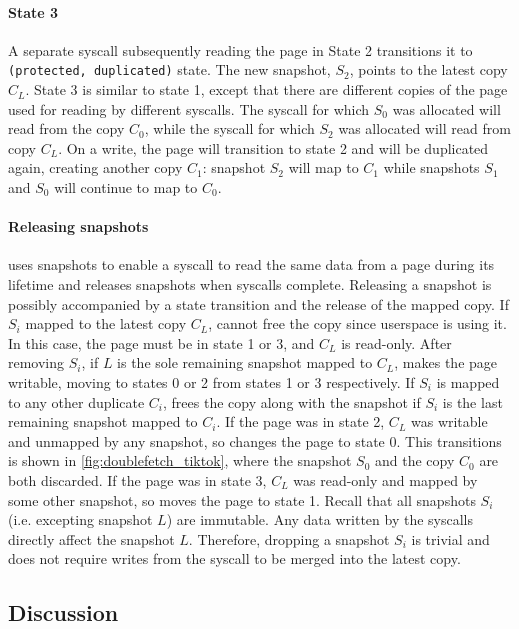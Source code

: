 \documentclass[letterpaper,twocolumn,10pt, anonymous]{article}
\begin{document}
\paragraph{State 3}
A separate syscall subsequently reading the page in State 2 transitions 
it to \texttt{(protected, duplicated)} state. 
The new snapshot, $S_2$, points to the latest copy $C_L$.
State 3 is similar to state 1, except that there are different copies of 
the page used for reading by different syscalls. 
The syscall for which $S_0$ was allocated will read from the copy $C_0$,
while the syscall for which $S_2$ was allocated will read from copy $C_L$.
On a write, the page will transition to state 2 and will be duplicated again,
creating another copy $C_1$: snapshot $S_2$ will map to $C_1$ while 
snapshots $S_1$ and $S_0$ will continue to map to $C_0$. 

\paragraph{Releasing snapshots}
\tiktok uses snapshots to enable a syscall to read the same data from a page 
during its lifetime and releases snapshots when syscalls complete. 
Releasing a snapshot is possibly accompanied by a state transition
and the release of the mapped copy.
If $S_i$ mapped to the latest copy $C_L$, \tiktok cannot free the copy
since userspace is using it.
In this case, the page must be in state 1 or 3, and $C_L$ is read-only.
After removing $S_i$, if $L$ is the sole remaining snapshot mapped to $C_L$, 
\tiktok makes the page writable, moving to states 0 or 2 from states 
1 or 3 respectively. 
If $S_i$ is mapped to any other duplicate $C_i$, \tiktok frees the copy along
with the snapshot if $S_i$ is the last remaining snapshot mapped to $C_i$.
If the page was in state 2, $C_L$ was writable and unmapped by any snapshot,
so \tiktok changes the page to state 0.
This transitions is shown in \autoref{fig:doublefetch_tiktok}, where the 
snapshot $S_0$ and the copy $C_0$ are both discarded.
If the page was in state 3, $C_L$ was read-only and mapped by some other
snapshot, so \tiktok moves the page to state 1.
Recall that all snapshots $S_i$ (i.e. excepting snapshot $L$) are immutable.
Any data written by the syscalls directly affect the snapshot $L$. 
Therefore, dropping a snapshot $S_i$ is trivial and does not require 
writes from the syscall to be merged into the latest copy.

\subsection{Discussion}
\end{document}

